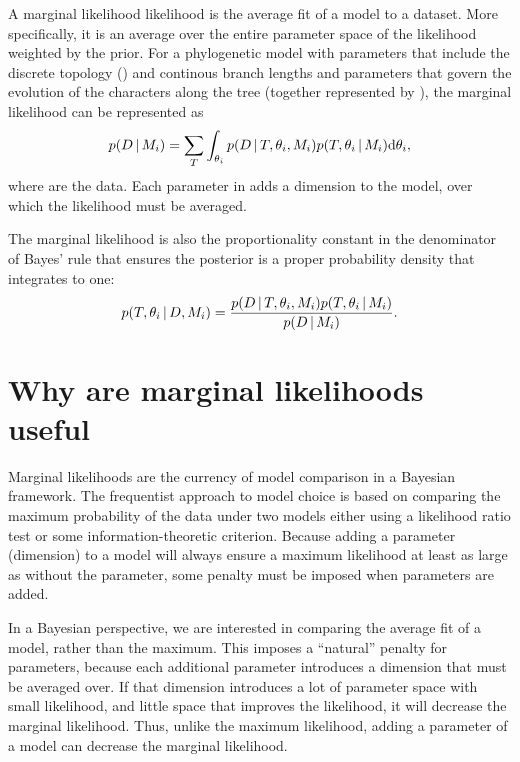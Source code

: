 \begin{linenomath}
A marginal likelihood likelihood is the average fit of a model to a dataset.
More specifically, it is an average over the entire parameter space of the
likelihood weighted by the prior.
For a phylogenetic model \model with parameters that include the discrete
topology (\topology) and continous branch lengths and parameters that govern
the evolution of the characters along the tree (together represented by
\evoparameters), the marginal likelihood can be represented as
\begin{equation}
    p(D \,|\, M_{i}) =
    \sum\limits_{T}
    \int_{\theta_{i}}
    p( D \,|\, T, \theta_{i}, M_{i})
    p(T, \theta_{i} \,|\, M_{i})
    \mathrm{d}\theta_{i},
    \label{eq:marginalLikelihood}
\end{equation}
where \data are the data.
Each parameter in \evoparameters adds a dimension to the model, over which the
likelihood must be averaged.
\end{linenomath}

\begin{linenomath}
The marginal likelihood is also the proportionality constant in the denominator
of Bayes' rule that ensures the posterior is a proper probability density that
integrates to one:
\begin{equation}
    p(T, \theta_{i} \,|\, D, M_{i}) = \frac{
        p(D \,|\, T, \theta_{i}, M_{i})
        p(T, \theta_{i} \,|\, M_{i})
    }{
        p(D \,|\, M_{i})
    }.
    \label{eq:bayesRule}
\end{equation}
\end{linenomath}

\section{Why are marginal likelihoods useful}

Marginal likelihoods are the currency of model comparison in a Bayesian
framework. The frequentist approach to model choice is based on comparing
the maximum probability of the data under two models either using
a likelihood ratio test or some information-theoretic criterion.
Because adding a parameter (dimension) to a model will always ensure
a maximum likelihood at least as large as without the parameter, some
penalty must be imposed when parameters are added.

In a Bayesian perspective, we are interested in comparing the average fit of a
model, rather than the maximum.
This imposes a ``natural'' penalty for parameters, because each additional
parameter introduces a dimension that must be averaged over.
If that dimension introduces a lot of parameter space with small likelihood,
and little space that improves the likelihood, it will decrease the marginal
likelihood.
Thus, unlike the maximum likelihood, adding a parameter of a model can
decrease the marginal likelihood.

